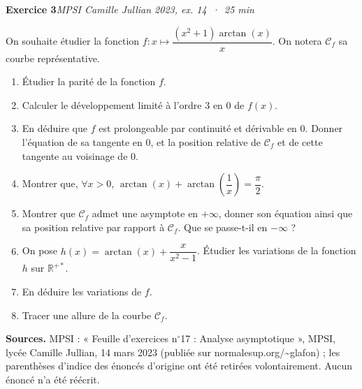 \documentclass[11pt,a4paper]{article}
\newcommand{\R}{\mathbb{R}}
\newcommand{\exo}[3]{\vspace{1.1em}\noindent\textbf{\large #1}\hfill\textit{#2 \,·\, #3}\par\smallskip}
\begin{document}
\exo{Exercice 3}{MPSI Camille Jullian 2023, ex. 14}{25 min}
\noindent On souhaite étudier la fonction $f : x\mapsto\dfrac{(x^2+1)\arctan(x)}{x}$. On notera $\mathcal{C}_f$ sa courbe représentative.
\begin{enumerate}
\item Étudier la parité de la fonction $f$.
\item Calculer le développement limité à l'ordre 3 en $0$ de $f(x)$.
\item En déduire que $f$ est prolongeable par continuité et dérivable en $0$. Donner l'équation de sa tangente en $0$, et la position relative de $\mathcal{C}_f$ et de cette tangente au voisinage de $0$.
\item Montrer que, $\forall x>0$, $\arctan(x)+\arctan\left(\dfrac1x\right)=\dfrac\pi2$.
\item Montrer que $\mathcal{C}_f$ admet une asymptote en $+\infty$, donner son équation ainsi que sa position relative par rapport à $\mathcal{C}_f$. Que se passe-t-il en $-\infty$ ?
\item On pose $h(x)=\arctan(x)+\dfrac{x}{x^2-1}$. Étudier les variations de la fonction $h$ sur $\R^{+*}$.
\item En déduire les variations de $f$.
\item Tracer une allure de la courbe $\mathcal{C}_f$.
\end{enumerate}

\vfill
\begin{small}
\noindent\textbf{Sources.} MPSI : « Feuille d'exercices n$^{\circ}$17 : Analyse asymptotique », MPSI, lycée Camille Jullian, 14 mars 2023 (publiée sur normalesup.org/\textasciitilde glafon) ; les parenthèses d'indice des énoncés d'origine ont été retirées volontairement. Aucun énoncé n'a été réécrit.
\end{small}
\end{document}
